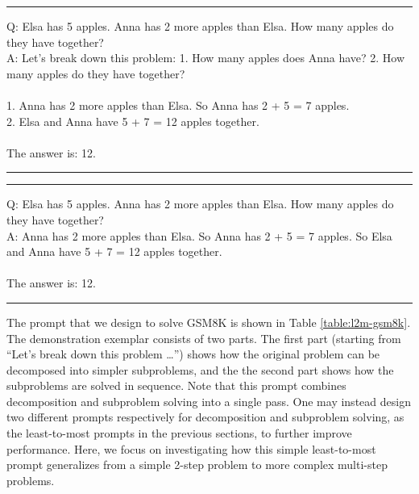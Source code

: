 \documentclass{article}
\begin{document}
\begin{table}[h!]
\centering
\hrule
\parbox{\textwidth}{
\vspace{5pt}
Q: Elsa has 5 apples. Anna has 2 more apples than Elsa. How many apples do they have together?\\
A: Let's break down this problem: 1. How many apples does Anna have? 2. How many apples do they have together?\\ \\
1. Anna has 2 more apples than Elsa. So Anna has 2 + 5 = 7 apples.\\
2. Elsa and Anna have 5 + 7 = 12 apples together.\\ \\
The answer is: 12.

\vspace{3pt}
}
\hrule
\vspace{5pt}
\caption {The least-to-most prompt for solving GSM8K. The demonstration problem is solved in only two steps, but the prompt can handle problems that require multiple steps to be solved.}
\label{table:l2m-gsm8k}
\end{table}


\begin{table}[h!]
\centering
\hrule
\parbox{\textwidth}{
\vspace{5pt}
Q: Elsa has 5 apples. Anna has 2 more apples than Elsa. How many apples do they have together?\\
A: Anna has 2 more apples than Elsa. So Anna has 2 + 5 = 7 apples. So Elsa and Anna have 5 + 7 = 12 apples together.\\ \\
The answer is: 12.

\vspace{3pt}
}
\hrule
\vspace{5pt}
\caption {The chain-of-thought prompt for solving GSM8K. It is derived from the least-to-most prompt in Table \ref{table:l2m-gsm8k} by removing the decomposition part.}
\label{table:cot-gsm8k}
\end{table}

The prompt that we design to solve GSM8K is shown in Table \ref{table:l2m-gsm8k}. The demonstration exemplar consists of two parts. The first part (starting from ``Let's break down this problem \dots'') shows how the original problem can be decomposed into simpler subproblems, and the the second part shows how the subproblems are solved in sequence. Note that this prompt combines decomposition and subproblem solving into a single pass. One may instead design two different prompts respectively for decomposition and subproblem solving, as the least-to-most prompts in the previous sections, to further improve performance. Here, we focus on investigating how this simple least-to-most prompt  generalizes from a simple 2-step problem to more complex multi-step problems.
\end{document}
